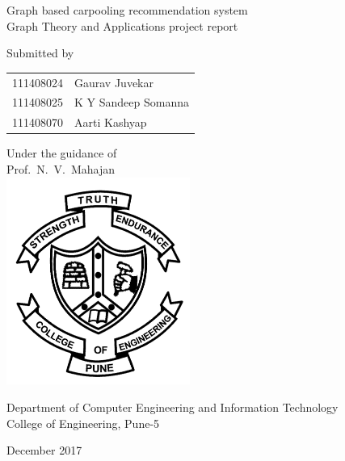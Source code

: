 \documentclass[main.tex]{subfiles}
\begin{document}
\begin{titlepage}
  \begin{center}
    \LARGE{Graph based carpooling recommendation system\\}
    \large{Graph Theory and Applications project report\\}
    \vspace{4ex}

    \normalsize{Submitted by}\\
    \begin{tabular}{ll}
      \large{111408024} & \large{Gaurav Juvekar}\\
      \large{111408025} & \large{K Y Sandeep Somanna}\\
      \large{111408070} & \large{Aarti Kashyap}\\
    \end{tabular}

    \vspace{1ex}
    \normalsize{Under the guidance of}\\
    \large{Prof.\ N.\ V.\ Mahajan}\\
    \includegraphics[width=6cm]{coep_shield.jpg}\par{}\vspace{1cm}
    \large{Department of Computer Engineering and Information Technology}\\
    \large{College of Engineering, Pune-5}\par{}
    \normalsize{December 2017}
  \end{center}
\end{titlepage}
\end{document}
